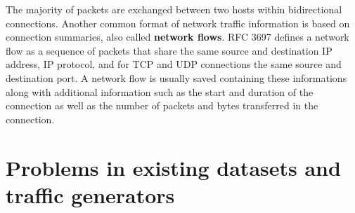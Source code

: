 \documentclass[sigconf,anonymous]{acmart}\usepackage[]{graphicx}\usepackage[]{color}
\begin{document}
The majority of packets are exchanged between two hosts within bidirectional connections. Another common format of network traffic information is based on connection summaries, also called \textbf{network flows}. RFC 3697 \cite{brownlee1999traffic} defines a network flow as a sequence of packets that share the same source and destination IP address, IP protocol, and for TCP and UDP connections the same source and destination port. A network flow is usually saved containing these informations along with additional information such as the start and duration of the connection as well as the number of packets and bytes transferred in the connection.


\section{Problems in existing datasets and traffic generators}


\end{document}
